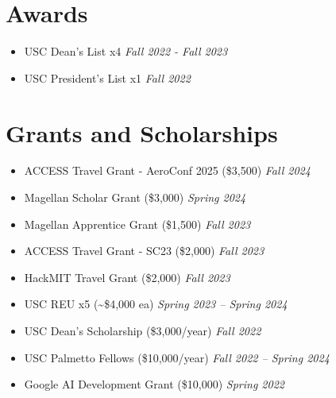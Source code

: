 \documentclass[letterpaper,11pt]{article}
\newcommand{\resumeItem}[1]{
  \item\small{
    {#1 \vspace{-2pt}}
  }
}
\newcommand{\resumeGrantHeading}[3]{
  \vspace{-2pt}\item
    #1 #2 \hfill \textit{#3} \\
}
\newcommand{\resumeAwardHeading}[2]{
  \vspace{-2pt}\item
    #1 \hfill \textit{#2} \\
}
\newcommand{\resumeSubItem}[1]{\resumeItem{#1}\vspace{-4pt}}
\newcommand{\resumeSubHeadingListStart}{\begin{itemize}[leftmargin=0.15in, label={}]}
\newcommand{\resumeSubHeadingListEnd}{\end{itemize}}
\begin{document}

\section{Awards}
  \vspace{2pt}
  \resumeSubHeadingListStart
    \resumeAwardHeading
      {USC Dean's List x4}{Fall 2022 - Fall 2023}
    \resumeAwardHeading
      {USC President's List x1}{Fall 2022}
    
  \resumeSubHeadingListEnd


\section{Grants and Scholarships}
  \resumeSubHeadingListStart
    \resumeGrantHeading{ACCESS Travel Grant - AeroConf 2025}{(\$3{,}500)}{Fall 2024}
    \resumeGrantHeading{Magellan Scholar Grant}{(\$3{,}000)}{Spring 2024}
    \resumeGrantHeading{Magellan Apprentice Grant}{(\$1{,}500)}{Fall 2023}
    \resumeGrantHeading{ACCESS Travel Grant - SC23}{(\$2{,}000)}{Fall 2023}
    \resumeGrantHeading{HackMIT Travel Grant}{(\$2{,}000)}{Fall 2023}
    \resumeGrantHeading{USC REU x5}{(\textasciitilde\$4{,}000 ea)}{Spring 2023 -- Spring 2024}
    \resumeGrantHeading{USC Dean's Scholarship}{(\$3{,}000/year)}{Fall 2022}
    \resumeGrantHeading{USC Palmetto Fellows}{(\$10{,}000/year)}{Fall 2022 -- Spring 2024}
    \resumeGrantHeading{Google AI Development Grant}{(\$10{,}000)}{Spring 2022}
    
  \resumeSubHeadingListEnd



\end{document}
